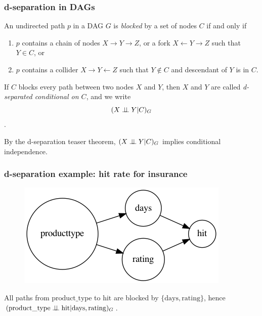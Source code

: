 \begin{frame}
\frametitle{d-separation in DAGs}
\begin{definition}
An undirected path $p$ in a DAG $G$ is \emph{blocked} by a set of nodes $C$ if and only if
\begin{enumerate}
\item $p$ contains a chain of nodes $X \to Y \to Z$, or a fork $X \leftarrow Y \rightarrow Z$ such that $Y \in C$, or
\item $p$ contains a collider $X \to Y \leftarrow Z$ such that $Y \notin C$ and descendant of $Y$ is in $C$.
\end{enumerate}
\end{definition}

\begin{definition}
If $C$ blocks every path between two nodes $X$ and $Y$, then $X$ and $Y$ are called \emph{d-separated conditional on $C$}, and we write 
$$(X \perp\!\!\!\perp Y | C)_{G}$$.
\end{definition}

By the d-separation teaser theorem, $(X \perp\!\!\!\perp Y | C)_{G}$ implies conditional independence.\newline
\end{frame}


\begin{frame}
\frametitle{d-separation example: hit rate for insurance}
\begin{figure}[ht]
  \centering
  \includegraphics[height=0.5\textheight]{graphics/hits}
\end{figure}

All paths from $\mathrm{product\_type}$ to $\mathrm{hit}$ are blocked by $\{\mathrm{days}, \mathrm{rating}\}$, hence $(\mathrm{product\_type} \perp\!\!\!\perp \mathrm{hit} | \mathrm{days}, \mathrm{rating})_G$.
\end{frame}


